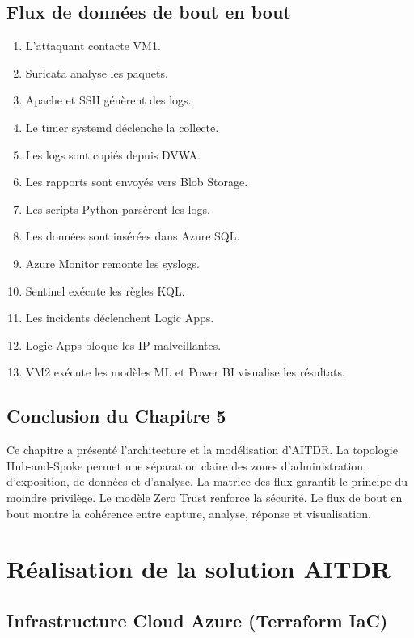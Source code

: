 \documentclass[11pt,a4paper]{report}
\begin{document}
\section{Flux de données de bout en bout}
\begin{enumerate}
  \item L'attaquant contacte VM1.
  \item Suricata analyse les paquets.
  \item Apache et SSH génèrent des logs.
  \item Le timer systemd déclenche la collecte.
  \item Les logs sont copiés depuis DVWA.
  \item Les rapports sont envoyés vers Blob Storage.
  \item Les scripts Python parsèrent les logs.
  \item Les données sont insérées dans Azure SQL.
  \item Azure Monitor remonte les syslogs.
  \item Sentinel exécute les règles KQL.
  \item Les incidents déclenchent Logic Apps.
  \item Logic Apps bloque les IP malveillantes.
  \item VM2 exécute les modèles ML et Power BI visualise les résultats.
\end{enumerate}

\section{Conclusion du Chapitre 5}
Ce chapitre a présenté l'architecture et la modélisation d'AITDR. La topologie Hub-and-Spoke permet une séparation claire des zones d'administration, d'exposition, de données et d'analyse. La matrice des flux garantit le principe du moindre privilège. Le modèle Zero Trust renforce la sécurité. Le flux de bout en bout montre la cohérence entre capture, analyse, réponse et visualisation.

\chapter{Réalisation de la solution AITDR}
\section{Infrastructure Cloud Azure (Terraform IaC)}
\end{document}
